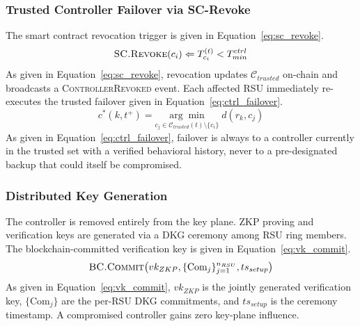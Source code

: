 \documentclass[12pt, a4paper]{report}
\begin{document}
{{\subsubsection{Trusted Controller Failover via SC-Revoke}
The smart contract revocation trigger is given in
Equation~\eqref{eq:sc_revoke}.
\begin{equation}
\textsc{SC.Revoke}(c_i)\Leftarrow
T_{c_i}^{(t)}<T_{min}^{ctrl}
\label{eq:sc_revoke}
\end{equation}
As given in Equation~\eqref{eq:sc_revoke}, revocation
updates $\mathcal{C}_{trusted}$ on-chain and broadcasts
a \textsc{ControllerRevoked} event. Each affected \ac{RSU}
immediately re-executes the trusted failover given in
Equation~\eqref{eq:ctrl_failover}.
\begin{equation}
c^*(k,t^+){=}
\underset{c_j\in
\mathcal{C}_{trusted}(t)\setminus\{c_i\}}
{\arg\min}\;d(r_k,c_j)
\label{eq:ctrl_failover}
\end{equation}
As given in Equation~\eqref{eq:ctrl_failover}, failover
is always to a controller currently in the trusted set
with a verified behavioral history, never to a
pre-designated backup that could itself be compromised.



\subsubsection{Distributed Key Generation}
The controller is removed entirely from the key plane.
\ac{ZKP} proving and verification keys are generated via
a \ac{DKG} ceremony among \ac{RSU} ring members. The
blockchain-committed verification key is given in
Equation~\eqref{eq:vk_commit}.
\begin{equation}
\textsc{BC.Commit}\!\left(vk_{ZKP},
\{\text{Com}_j\}_{j=1}^{n_{RSU}},
ts_{setup}\right)
\label{eq:vk_commit}
\end{equation}
As given in Equation~\eqref{eq:vk_commit}, $vk_{ZKP}$
is the jointly generated verification key,
$\{\text{Com}_j\}$ are the per-\ac{RSU} \ac{DKG}
commitments, and $ts_{setup}$ is the ceremony timestamp.
A compromised controller gains zero key-plane influence.



}}
\end{document}
